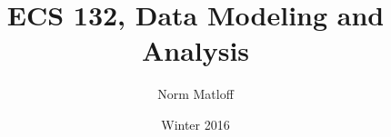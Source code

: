 
\title{ECS 132, Data Modeling and Analysis}

\author{Norm Matloff}

\date{Winter 2016}  

\maketitle

